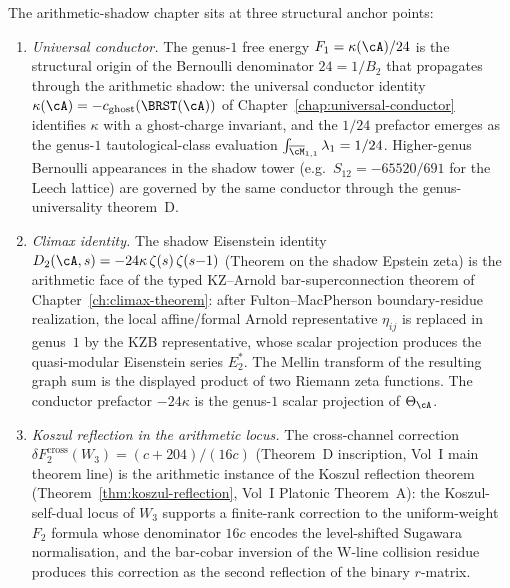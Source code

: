 \begin{remark}
\label{rem:as-anchors}
The arithmetic-shadow chapter sits at three structural
anchor points:
\begin{enumerate}[label=\textup{(W\arabic*)}]
\item \emph{Universal conductor.} The genus-$1$ free energy
 $F_1 = \kappa(\cA)/24$ is the structural origin of the
 Bernoulli denominator $24 = 1/B_2$ that propagates through
 the arithmetic shadow: the universal
 conductor identity $\kappa(\cA) = -c_{\mathrm{ghost}}(\BRST(\cA))$
 of Chapter~\ref{chap:universal-conductor} identifies $\kappa$
 with a ghost-charge invariant, and the $1/24$ prefactor
 emerges as the genus-$1$ tautological-class evaluation
 $\int_{\overline{\cM}_{1,1}} \lambda_1 = 1/24$. Higher-genus
 Bernoulli appearances in the shadow tower (e.g.\ $S_{12} =
 -65520/691$ for the Leech lattice) are governed by the same
 conductor through the genus-universality theorem~D.
\item \emph{Climax identity.} The shadow Eisenstein identity
 $D_2(\cA, s) = -24\kappa\,\zeta(s)\,\zeta(s{-}1)$
 (Theorem on the shadow Epstein zeta) is the arithmetic face
 of the typed KZ--Arnold bar-superconnection theorem of
 Chapter~\ref{ch:climax-theorem}: after Fulton--MacPherson
 boundary-residue realization, the local affine/formal Arnold
 representative $\eta_{ij}$ is replaced in genus~$1$ by the KZB
 representative, whose scalar projection produces the quasi-modular
 Eisenstein series $E_2^*$.  The Mellin transform of the resulting
 graph sum is the displayed product of two Riemann zeta functions.
 The conductor
 prefactor $-24\kappa$ is the genus-$1$ scalar projection of
 $\Theta_\cA$.
\item \emph{Koszul reflection in the arithmetic locus.} The
 cross-channel correction
 $\delta F_2^{\mathrm{cross}}(W_3) = (c+204)/(16c)$
 (Theorem~D inscription, Vol~I main theorem line) is the
 arithmetic instance of the Koszul reflection theorem
 (Theorem~\ref{thm:koszul-reflection}, Vol~I Platonic
 Theorem~A): the Koszul-self-dual locus of $W_3$ supports a
 finite-rank correction to the uniform-weight $F_2$ formula
 whose denominator $16c$ encodes the level-shifted Sugawara
 normalisation, and the bar-cobar inversion of the W-line
 collision residue produces this correction as the second
 reflection of the binary $r$-matrix.
\end{enumerate}


\end{remark}
